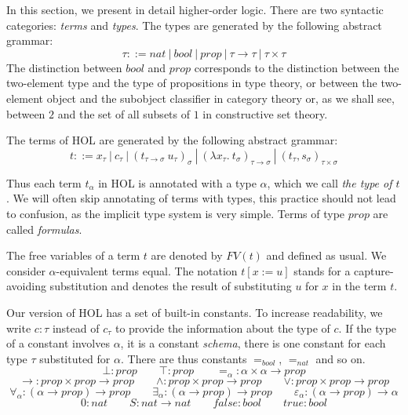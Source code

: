 \documentclass{LMCS}
\newcommand\rimpl{\ensuremath{\to}}
\renewcommand{\prop}{{prop}}
\begin{document}
In this section, we present in detail higher-order logic. 
There are two syntactic categories: \emph{terms} and \emph{types}. The types are 
generated by the following abstract grammar:
\[
\tau ::= nat\ |\ bool\ |\ \prop\ |\ \tau \to \tau\ |\ \tau \times \tau
\]
The distinction between $bool$ and $prop$ corresponds to the distinction
between the two-element type and the type of propositions in type theory, or
between the two-element object and the subobject classifier in category theory or,
as we shall see, between $2$ and the set of all subsets of $1$ in constructive set theory.

The terms of HOL are generated by the following abstract grammar:
\[
t ::= x_\tau\ |\ c_\tau \ |\ (t_{\tau \to \sigma}\ u_{\tau})_\sigma\ |\
(\lambda x_\tau.\ t_\sigma)_{\tau \to \sigma}\ |\ (t_\tau, s_\sigma)_{\tau
\times \sigma}
\]

Thus each term $t_\alpha$ in HOL is annotated with a type $\alpha$, which we
call \emph{the type of $t$}. We will often skip annotating of terms with
types, this practice should not lead to confusion, as the implicit type
system is very simple. Terms of type $\prop$ are called \emph{formulas}. 

The free variables of a term $t$ are denoted by $FV(t)$ and defined as
usual. We consider $\alpha$-equivalent terms equal. The notation $t[x:=u]$
stands for a capture-avoiding substitution and denotes the result of
substituting $u$ for $x$ in the term $t$. 

Our version of HOL has a set of built-in constants. To increase readability,
we write $c : \tau$ instead of $c_\tau$ to provide the information about the
type of $c$. If the type of a constant involves
$\alpha$, it is a constant \emph{schema}, there is one constant for each
type $\tau$ substituted for $\alpha$. There are thus constants $=_{bool}$,
$=_{nat}$ and so on. 
\[
\bot : prop \qquad  \top : prop \qquad =_{\alpha} : \alpha \times \alpha \to prop 
\]
\[
\rimpl : prop \times prop \to prop \qquad \land : prop \times prop \to prop \qquad \lor : prop
\times prop \to prop
\]
\[
\forall_\alpha : (\alpha \to prop) \to prop \qquad \exists_\alpha : (\alpha \to prop) \to prop \qquad \varepsilon_\alpha : (\alpha \to \prop) \to \alpha
\]
\[
0 : nat \qquad S : nat \to nat \qquad false : bool \qquad true : bool
\]
\end{document}
